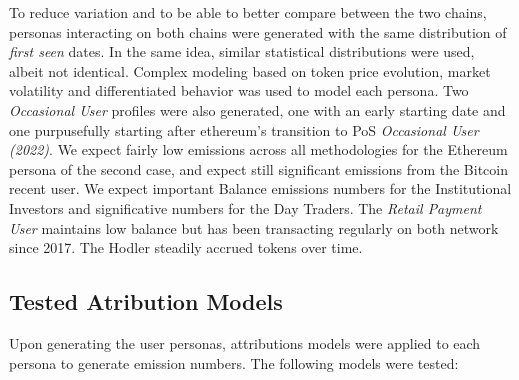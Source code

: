 \documentclass[11pt]{report}
\begin{document}




To reduce variation and to be able to better compare between the two chains, personas interacting on both chains were generated with the same distribution of \textit{first seen} dates. In the same idea, similar statistical distributions were used, albeit not identical. Complex modeling based on token price evolution, market volatility and differentiated behavior was used to model each persona. Two \textit{Occasional User} profiles were also generated, one with an early starting date and one purpusefully starting after ethereum's transition to PoS \textit{Occasional User (2022)}. We expect fairly low emissions across all methodologies for the Ethereum persona of the second case, and expect still significant emissions from the Bitcoin recent user. We expect important Balance emissions numbers for the Institutional Investors and significative numbers for the Day Traders. The \textit{Retail Payment User} maintains low balance but has been transacting regularly on both network since 2017. The Hodler steadily accrued tokens over time.

\subsection{Tested Atribution Models}

Upon generating the user personas, attributions models were applied to each persona to generate emission numbers. The following models were tested:

\end{document}
